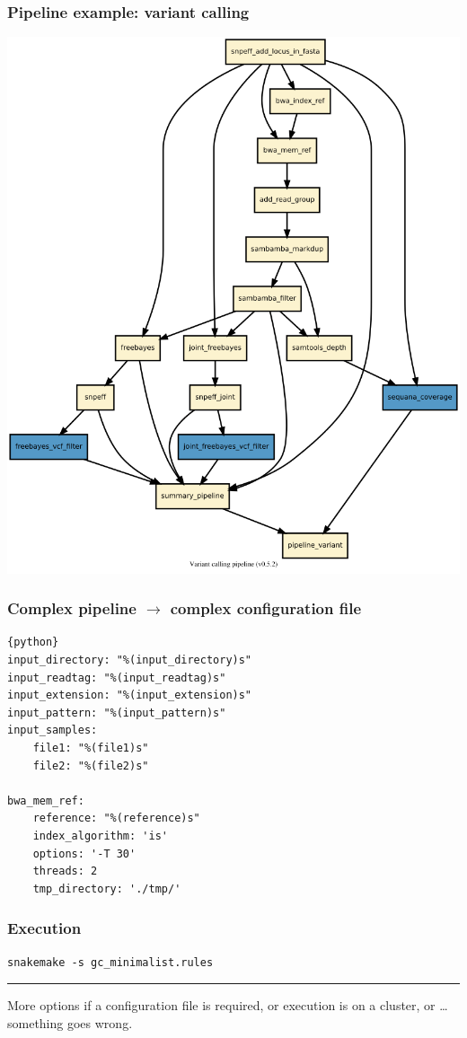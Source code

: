 \documentclass{beamer}
\begin{document}
\begin{frame}
\frametitle{Pipeline example: variant calling}
\centering
\includegraphics[height=0.8\textheight,
width=\textwidth]{./images/variant_calling_dag.png}
\end{frame}


\begin{frame}[fragile]
\frametitle{Complex pipeline $\rightarrow$ complex configuration file}

\begin{lstlisting}{python}
input_directory: "%(input_directory)s"
input_readtag: "%(input_readtag)s"
input_extension: "%(input_extension)s"
input_pattern: "%(input_pattern)s"
input_samples:
    file1: "%(file1)s"
    file2: "%(file2)s"

bwa_mem_ref:
    reference: "%(reference)s"
    index_algorithm: 'is'
    options: '-T 30'
    threads: 2
    tmp_directory: './tmp/'
\end{lstlisting}
\end{frame}

\begin{frame}[fragile]
\frametitle{Execution}

\begin{lstlisting}[basicstyle=\ttfamily\large]
snakemake -s gc_minimalist.rules
\end{lstlisting}

\rule{\textwidth}{1pt}

More options if a configuration file is required, or execution is on a cluster, 
or \dots something goes wrong.
\end{frame}
\end{document}
